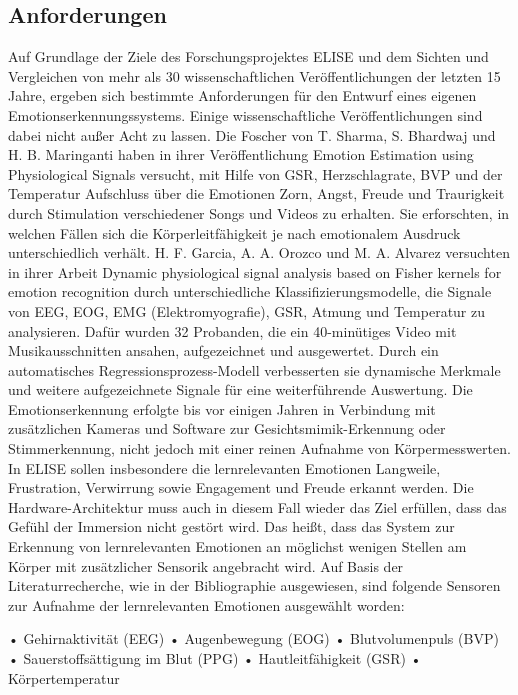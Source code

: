 \subsection{Anforderungen} \label{anfoderungen-1}

Auf Grundlage der Ziele des Forschungsprojektes ELISE und dem Sichten und Vergleichen von mehr als 30 wissenschaftlichen Veröffentlichungen der letzten 15 Jahre, ergeben sich bestimmte
Anforderungen für den Entwurf eines eigenen Emotionserkennungssystems. Einige wissenschaftliche Veröffentlichungen sind dabei nicht außer Acht zu lassen. Die Foscher von T.
Sharma, S. Bhardwaj und H. B. Maringanti haben in ihrer Veröffentlichung Emotion Estimation
using Physiological Signals versucht, mit Hilfe von GSR, Herzschlagrate,
BVP und der Temperatur Aufschluss über die Emotionen Zorn, Angst, Freude und Traurigkeit
durch Stimulation verschiedener Songs und Videos zu erhalten. Sie erforschten, in
welchen Fällen sich die Körperleitfähigkeit je nach emotionalem Ausdruck unterschiedlich
verhält. H. F. Garcia, A. A. Orozco und M. A. Alvarez versuchten in ihrer Arbeit Dynamic
physiological signal analysis based on Fisher kernels for emotion recognition durch unterschiedliche Klassifizierungsmodelle, die Signale von EEG, EOG, EMG (Elektromyografie),
GSR, Atmung und Temperatur zu analysieren. Dafür wurden 32 Probanden,
die ein 40-minütiges Video mit Musikausschnitten ansahen, aufgezeichnet und ausgewertet.
Durch ein automatisches Regressionsprozess-Modell verbesserten sie dynamische Merkmale
und weitere aufgezeichnete Signale für eine weiterführende Auswertung.
Die Emotionserkennung erfolgte bis vor einigen Jahren in Verbindung mit zusätzlichen Kameras
und Software zur Gesichtsmimik-Erkennung oder Stimmerkennung, nicht jedoch mit
einer reinen Aufnahme von Körpermesswerten. In ELISE sollen insbesondere die lernrelevanten Emotionen Langweile, Frustration, Verwirrung sowie Engagement und Freude erkannt
werden. Die Hardware-Architektur muss auch in diesem Fall wieder das Ziel erfüllen, dass
das Gefühl der Immersion nicht gestört wird. Das heißt, dass das System zur Erkennung von
lernrelevanten Emotionen an möglichst wenigen Stellen am Körper mit zusätzlicher Sensorik
angebracht wird.
Auf Basis der Literaturrecherche, wie in der Bibliographie ausgewiesen, sind folgende Sensoren
zur Aufnahme der lernrelevanten Emotionen ausgewählt worden:

• Gehirnaktivität (EEG)
• Augenbewegung (EOG)
• Blutvolumenpuls (BVP)
• Sauerstoffsättigung im Blut (PPG)
• Hautleitfähigkeit (GSR)
• Körpertemperatur

